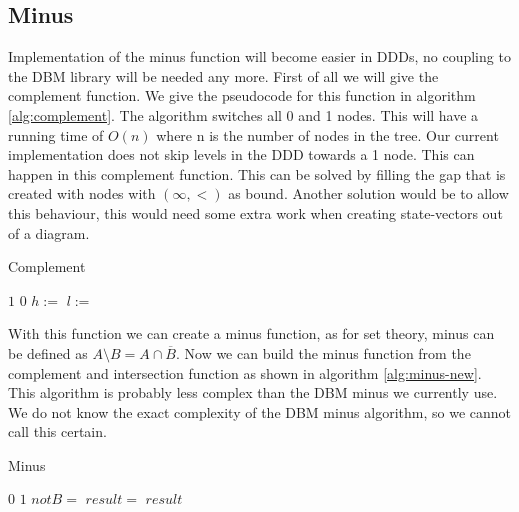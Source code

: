 \subsection{Minus}
Implementation of the minus function will become easier in DDDs, no coupling to the DBM library will be needed any more. First of all we will give the complement function. We give the pseudocode for this function in algorithm \ref{alg:complement}. The algorithm switches all 0 and 1 nodes. This will have a running time of $O(n)$ where n is the number of nodes in the tree. Our current implementation does not skip levels in the DDD towards a 1 node. This can happen in this complement function. This can be solved by filling the gap that is created with nodes with $(\infty,<)$ as bound. Another solution would be to allow this behaviour, this would need some extra work when creating state-vectors out of a diagram.

\begin{algorithm}
\caption{Complement}\label{alg:complement}
\begin{algorithmic}[1]
		\State \Return $1$
	\EndIf
		\State \Return $0$
	\EndIf
	\State $h :=$ 
	\State $l :=$ 
	\State \Return {}
	
\EndProcedure	
\end{algorithmic}
\end{algorithm}

With this function we can create a minus function, as for set theory, minus can be defined as $A \setminus B = A \cap \overline{B}$. Now we can build the minus function from the complement and intersection function as shown in algorithm \ref{alg:minus-new}. This algorithm is probably less complex than the DBM minus we currently use. We do not know the exact complexity of the DBM minus algorithm, so we cannot call this certain.

\begin{algorithm}
\caption{Minus}\label{alg:minus-new}
\begin{algorithmic}[1]
		\State \Return $0$
	\EndIf
		\State \Return $1$
	\EndIf
	\State $notB = $
	\State $result =$ 
	\State \Return $result$
	
\EndProcedure	
\end{algorithmic}
\end{algorithm}

